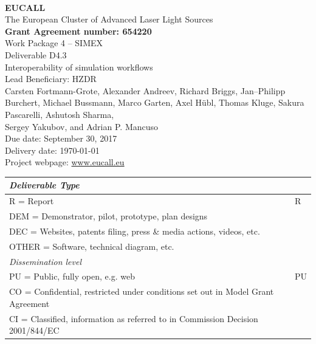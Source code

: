 \documentclass[10pt]{scrartcl}
\begin{document}
\makeatletter
\begin{titlepage}
\thispagestyle{scrheadings}
\begin{center}
$~$\\
\vspace{0cm}
{\Large\textbf{EUCALL}\\[2ex]
The European Cluster of Advanced Laser Light Sources}\\[4ex]
%
{\small\textbf{Grant Agreement number: 654220}}\\[8ex]
%
Work Package 4 -- SIMEX\\[4ex]
%
Deliverable D4.3\\
%
Interoperability of simulation workflows\\[5ex]
%
Lead Beneficiary: HZDR\\[5ex]
%
Carsten Fortmann-Grote,
Alexander Andreev,
Richard Briggs,
Jan--Philipp Burchert,
Michael Bussmann,
Marco Garten,
Axel H\"ubl,
Thomas Kluge,
Sakura Pascarelli,
Ashutosh Sharma,\\
Sergey Yakubov,
and
Adrian P. Mancuso\\[4ex]
%
Due date: September 30, 2017\\
Delivery date: \today \\[4ex]
%
Project webpage: \url{www.eucall.eu}\\[6ex]
%
{%
\small
\begin{tabular}{|l|l|}
  \hline
  \multicolumn{2}{|l|}{ \textit{Deliverable Type} } \\
  \hline
  R = Report\hfill & R \\
  DEM = Demonstrator, pilot, prototype, plan designs & \\
  DEC = Websites, patents filing, press \& media actions, videos, etc. & \\
  OTHER = Software, technical diagram, etc. & \\
  \hline
  \multicolumn{2}{|l|}{\textit{Dissemination level}} \\
  \hline
  PU = Public, fully open, e.g. web & PU \\
  CO = Confidential, restricted under conditions set out in Model Grant
  Agreement\hspace*{17ex}\  & \\
  CI = Classified, information as referred to in Commission Decision 2001/844/EC
  & \\
  \hline
\end{tabular}
}

\end{center}
%
{}
\normalfont
\end{titlepage}
\makeatother
%
\tableofcontents
%
\newpage
%
\end{document}
